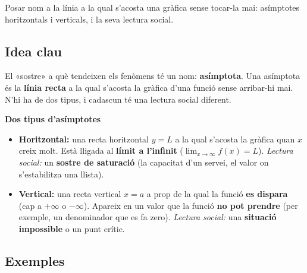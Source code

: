 %
{Posar nom a la línia a la qual s'acosta una gràfica sense tocar-la mai: asímptotes horitzontals i verticals, i la seva lectura social.}

\subsection{Idea clau}

El «sostre» a què tendeixen els fenòmens té un nom: \textbf{asímptota}. Una asímptota
és la \textbf{línia recta} a la qual s'acosta la gràfica d'una funció sense arribar-hi
mai. N'hi ha de dos tipus, i cadascun té una lectura social diferent.

\begin{idea}
\textbf{Dos tipus d'asímptotes}
\begin{itemize}[leftmargin=1.4em, itemsep=3pt]
  \item \textbf{Horitzontal:} una recta horitzontal $y=L$ a la qual s'acosta la gràfica
        quan $x$ creix molt. Està lligada al \textbf{límit a l'infinit}
        ($\lim_{x\to\infty}f(x)=L$). \emph{Lectura social:} un \textbf{sostre de
        saturació} (la capacitat d'un servei, el valor on s'estabilitza una llista).
  \item \textbf{Vertical:} una recta vertical $x=a$ a prop de la qual la funció
        \textbf{es dispara} (cap a $+\infty$ o $-\infty$). Apareix en un valor que la
        funció \textbf{no pot prendre} (per exemple, un denominador que es fa zero).
        \emph{Lectura social:} una \textbf{situació impossible} o un punt crític.
\end{itemize}
\end{idea}

\subsection{Exemples}

